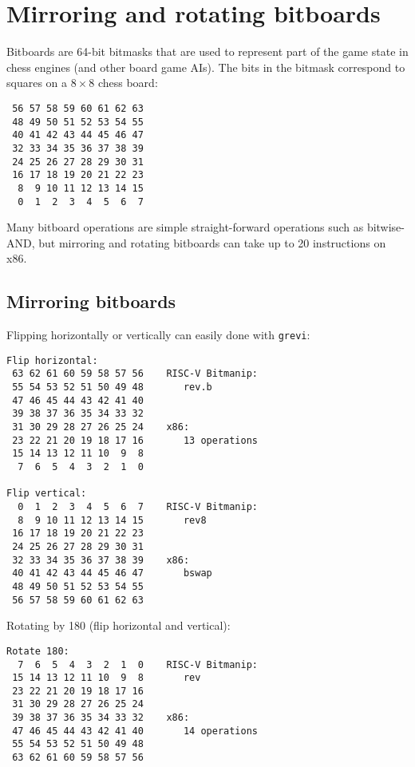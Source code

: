 
\section{Mirroring and rotating bitboards}

Bitboards are 64-bit bitmasks that are used to represent part of the game state
in chess engines (and other board game AIs). The bits in the bitmask correspond
to squares on a $8 \times 8$ chess board:

\begin{verbatim}
 56 57 58 59 60 61 62 63
 48 49 50 51 52 53 54 55
 40 41 42 43 44 45 46 47
 32 33 34 35 36 37 38 39
 24 25 26 27 28 29 30 31
 16 17 18 19 20 21 22 23
  8  9 10 11 12 13 14 15
  0  1  2  3  4  5  6  7
\end{verbatim}

Many bitboard operations are simple straight-forward operations such as
bitwise-AND, but mirroring and rotating bitboards can take up to 20
instructions on x86.

\subsection{Mirroring bitboards}

Flipping horizontally or vertically can easily done with {\tt grevi}:

\begin{verbatim}
Flip horizontal:
 63 62 61 60 59 58 57 56    RISC-V Bitmanip:
 55 54 53 52 51 50 49 48       rev.b
 47 46 45 44 43 42 41 40
 39 38 37 36 35 34 33 32
 31 30 29 28 27 26 25 24    x86:
 23 22 21 20 19 18 17 16       13 operations
 15 14 13 12 11 10  9  8
  7  6  5  4  3  2  1  0

Flip vertical:
  0  1  2  3  4  5  6  7    RISC-V Bitmanip:
  8  9 10 11 12 13 14 15       rev8
 16 17 18 19 20 21 22 23
 24 25 26 27 28 29 30 31
 32 33 34 35 36 37 38 39    x86:
 40 41 42 43 44 45 46 47       bswap
 48 49 50 51 52 53 54 55
 56 57 58 59 60 61 62 63
\end{verbatim}

Rotating by 180 (flip horizontal and vertical):

\begin{verbatim}
Rotate 180:
  7  6  5  4  3  2  1  0    RISC-V Bitmanip:
 15 14 13 12 11 10  9  8       rev
 23 22 21 20 19 18 17 16
 31 30 29 28 27 26 25 24
 39 38 37 36 35 34 33 32    x86:
 47 46 45 44 43 42 41 40       14 operations
 55 54 53 52 51 50 49 48
 63 62 61 60 59 58 57 56
\end{verbatim}

